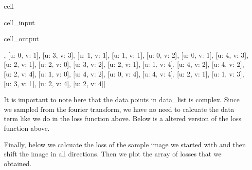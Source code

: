 \documentclass[letterpaper,10pt,english]{jupyterBook}
\begin{document}
\begin{sphinxuseclass}{cell}\begin{sphinxVerbatimInput}

\begin{sphinxuseclass}{cell_input}
\begin{sphinxVerbatim}[commandchars=\\\{\}]
   
\end{sphinxVerbatim}

\end{sphinxuseclass}\end{sphinxVerbatimInput}
\begin{sphinxVerbatimOutput}

\begin{sphinxuseclass}{cell_output}
\begin{sphinxVerbatim}[commandchars=\\\{\}]
[[u: 4, v: 0],
 [u: 0, v: \PYGZhy{}1],
 [u: 3, v: 3],
 [u: 1, v: 1],
 [u: 1, v: 1],
 [u: 0, v: 2],
 [u: 0, v: \PYGZhy{}1],
 [u: \PYGZhy{}4, v: 3],
 [u: \PYGZhy{}2, v: 1],
 [u: 2, v: 0],
 [u: \PYGZhy{}3, v: \PYGZhy{}2],
 [u: \PYGZhy{}2, v: \PYGZhy{}1],
 [u: \PYGZhy{}1, v: 4],
 [u: \PYGZhy{}4, v: \PYGZhy{}2],
 [u: \PYGZhy{}4, v: \PYGZhy{}2],
 [u: 2, v: \PYGZhy{}4],
 [u: 1, v: 0],
 [u: \PYGZhy{}4, v: \PYGZhy{}2],
 [u: 0, v: \PYGZhy{}4],
 [u: \PYGZhy{}4, v: 4],
 [u: \PYGZhy{}2, v: \PYGZhy{}1],
 [u: 1, v: 3],
 [u: 3, v: 1],
 [u: 2, v: \PYGZhy{}4],
 [u: 2, v: 4]]
\end{sphinxVerbatim}

\end{sphinxuseclass}\end{sphinxVerbatimOutput}

\end{sphinxuseclass}
\sphinxAtStartPar
It is important to note here that the data points in data\_list is complex. Since we sampled from the fourier transform, we have no need to calcuate the data term like we do in the loss function above. Below is a altered version of the loss function above.

\sphinxAtStartPar
Finally, below we calcuate the loss of the sample image we started with and then shift the image in all directions. Then we plot the array of losses that we obtained.
\end{document}
